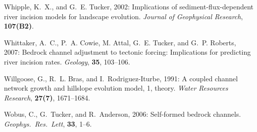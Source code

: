 \documentclass[12pt,reqno]{amsart}
\begin{document}
\begin{thebibliography}{41}
Whipple, K.~X., and G.~E. Tucker, 2002: Implications of
  sediment-flux-dependent river incision models for landscape
  evolution. {\em Journal of Geophysical Research\/}, {\bf 107(B2)}.

Whittaker, A.~C., P.~A. Cowie, M. Attal, G.~E. Tucker, and
  G.~P. Roberts, 2007: Bedrock channel adjustment to tectonic forcing:
  Implications for predicting river incision rates. {\em Geology\/},
  {\bf 35}, 103--106. 

Willgoose, G., R.~L. Bras, and I.~Rodriguez-Iturbe, 1991: A coupled channel
  network growth and hillslope evolution model, 1, theory. {\em Water Resources
  Research\/}, {\bf 27(7)}, 1671--1684.

Wobus, C., G.~Tucker, and R.~Anderson, 2006: {Self-formed bedrock channels}.
  {\em Geophys.\ Res.\ Lett\/}, {\bf 33}, 1--6.

\end{thebibliography}



\end{document}
